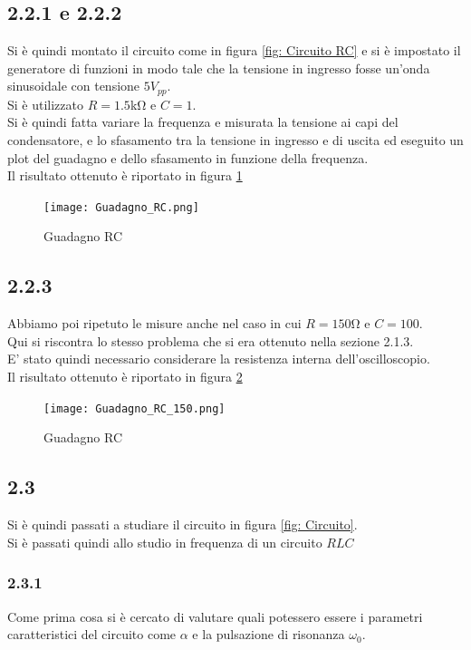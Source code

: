 \subsection{2.2.1 e 2.2.2}
Si è quindi montato il circuito come in figura \ref{fig: Circuito RC} e si è impostato il generatore di funzioni in modo tale che la tensione in ingresso fosse un'onda sinusoidale con tensione $5V_{pp}$.\\
Si è utilizzato $R=1.5$\unit{\kohm} e $C=1$\unit{\nF}.\\
Si è quindi fatta variare la frequenza e misurata la tensione ai capi del condensatore, e lo sfasamento tra la tensione in ingresso e di uscita ed eseguito un plot del guadagno e dello sfasamento in funzione della frequenza.\\
Il risultato ottenuto è riportato in figura \ref{fig: Guadagno RC}
\begin{figure}
    \centering
    \texttt{[image: Guadagno\_RC.png]}
    \caption{Guadagno RC}
    \label{fig: Guadagno RC}
\end{figure}
\subsection{2.2.3}
Abbiamo poi ripetuto le misure anche nel caso in cui $R=150$\unit{\ohm} e $C=100$\unit{\nF}.\\
Qui si riscontra lo stesso problema che si era ottenuto nella sezione 2.1.3.\\
E' stato quindi necessario considerare la resistenza interna dell'oscilloscopio.\\
Il risultato ottenuto è riportato in figura \ref{fig: Guadagno RC 150}
\begin{figure}
    \centering
    \texttt{[image: Guadagno\_RC\_150.png]}
    \caption{Guadagno RC}
    \label{fig: Guadagno RC 150}
\end{figure}
\subsection{2.3}
Si è quindi passati a studiare il circuito in figura \ref{fig: Circuito}.\\
Si è passati quindi allo studio in frequenza di un circuito $RLC$\\
\subsubsection{2.3.1}
Come prima cosa si è cercato di valutare quali potessero essere i parametri caratteristici del circuito come $\alpha$ e la pulsazione di risonanza $\omega_0$.\\

